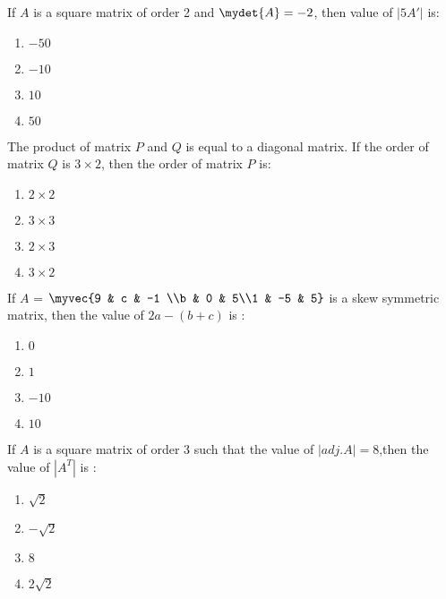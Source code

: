 \item If $A$ is a square matrix of order 2 and $\mydet{A} = -2$, then  value of $|5A'|$ is:                                                            \begin{enumerate}                            
\item $-50$                                                             
\item $-10$	        
\item $10$                                                              
\item $50$                                                          
\end{enumerate} 
        
\item The product of matrix $P$ and $Q$ is equal to a diagonal matrix. If the order of matrix $Q$ is $ 3 \times 2 $, then the order of matrix $P$ is:                                                    
	\begin{enumerate}
\item $2 \times 2$                                                      
\item $3 \times 3$                                                      
\item $2 \times 3$                                                      
\item $3 \times 2$                                                          
\end{enumerate}         
                                                                                                               
                       \item If $A$ = $\myvec{9 & c & -1 \\b & 0 & 5\\1 & -5 & 5}$ is a skew symmetric matrix, then the value of $2a - (b+c)$ is :
		\begin{enumerate}
	\item ${0}$
        \item ${1}$
	\item ${-10}$
	\item ${10}$
	\end{enumerate}

\item If $A$ is a square matrix of order $3$ such that the value of $|adj.A| = 8$,then the value of $|A^T|$ is :
		\begin{enumerate}
		\item $\sqrt{2}$
			\item $-\sqrt{2}$
			\item $8$
			\item $2 \sqrt{2}$
	\end{enumerate}


